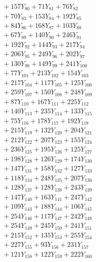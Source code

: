 \documentclass[a4paper,10pt]{article}
\begin{document}
{\begin{align}
&\;  + 157 Y_{80} + 71 Y_{81} + 76 Y_{82} \\[0.3ex]
&\;  + 70 Y_{83} + 153 Y_{84} + 192 Y_{85} \\[0.3ex]
&\;  + 84 Y_{86} + 168 Y_{87} + 103 Y_{88} \\[0.5ex]\allowbreak
&\;  + 67 Y_{89} + 140 Y_{90} + 246 Y_{91} \\[0.3ex]
&\;  + 192 Y_{92} + 144 Y_{93} + 217 Y_{94} \\[0.3ex]
&\;  + 206 Y_{95} + 249 Y_{96} + 202 Y_{97} \\[0.3ex]
&\;  + 130 Y_{98} + 149 Y_{99} + 241 Y_{100} \\[0.3ex]
&\;  + 77 Y_{101} + 213 Y_{102} + 154 Y_{103} \\[0.3ex]
&\;  + 217 Y_{104} + 117 Y_{105} + 125 Y_{106} \\[0.3ex]
&\;  + 259 Y_{107} + 150 Y_{108} + 248 Y_{109} \\[0.3ex]
&\;  + 87 Y_{110} + 167 Y_{111} + 225 Y_{112} \\[0.3ex]
&\;  + 140 Y_{113} + 235 Y_{114} + 133 Y_{115} \\[0.3ex]
&\;  + 75 Y_{116} + 178 Y_{117} + 192 Y_{118} \\[0.5ex]\allowbreak
&\;  + 215 Y_{119} + 132 Y_{120} + 204 Y_{121} \\[0.3ex]
&\;  + 212 Y_{122} + 207 Y_{123} + 155 Y_{124} \\[0.3ex]
&\;  + 236 Y_{125} + 195 Y_{126} + 125 Y_{127} \\[0.3ex]
&\;  + 198 Y_{128} + 126 Y_{129} + 174 Y_{130} \\[0.3ex]
&\;  + 147 Y_{131} + 158 Y_{132} + 127 Y_{133} \\[0.3ex]
&\;  + 118 Y_{134} + 248 Y_{135} + 207 Y_{136} \\[0.3ex]
&\;  + 128 Y_{137} + 128 Y_{138} + 243 Y_{139} \\[0.3ex]
&\;  + 147 Y_{140} + 163 Y_{141} + 247 Y_{142} \\[0.3ex]
&\;  + 109 Y_{143} + 188 Y_{144} + 106 Y_{145} \\[0.3ex]
&\;  + 254 Y_{146} + 117 Y_{147} + 242 Y_{148} \\[0.5ex]\allowbreak
&\;  + 254 Y_{149} + 245 Y_{150} + 241 Y_{151} \\[0.3ex]
&\;  + 215 Y_{152} + 135 Y_{153} + 255 Y_{154} \\[0.3ex]
&\;  + 227 Y_{155} + 93 Y_{156} + 231 Y_{157} \\[0.3ex]
&\;  + 121 Y_{158} + 122 Y_{159} + 222 Y_{160} \\[0.3ex]

\end{align}}
\end{document}

